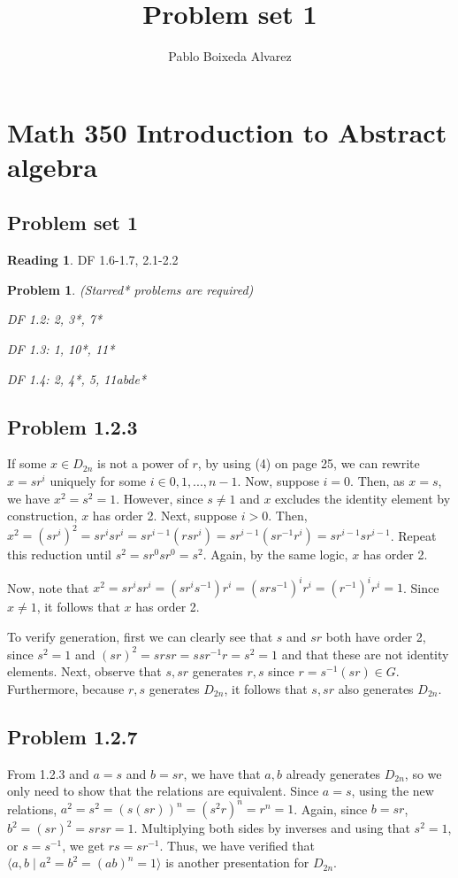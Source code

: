 \documentclass[11 pt]{article}
\title{Problem set 1}
\author{Pablo Boixeda Alvarez}
\newtheorem{Prob}{Problem}
\theoremstyle{definition}
\newtheorem{re}{Reading}
\theoremstyle{remark}
\begin{document}
\section*{Math 350 Introduction to Abstract algebra}
\subsection*{Problem set 1}

\begin{re}
	DF 1.6-1.7, 2.1-2.2
\end{re}
\begin{Prob} (Starred* problems are required)
	
	DF 1.2: 2, 3*, 7*
	
	DF 1.3: 1, 10*, 11*
	
	DF 1.4: 2, 4*, 5, 11abde*
\end{Prob}

\subsection*{Problem 1.2.3}
If some $x \in D_{2n}$ is not a power of $r$, by using (4) on page 25, we can rewrite $x = sr^i$ uniquely for some $i \in {0,1,...,n-1}$. Now, suppose $i=0$. Then, as $x=s$, we have $x^2=s^2=1$. However, since $s \neq 1$ and $x$ excludes the identity element by construction, $x$ has order 2. Next, suppose $i > 0$. Then, $x^2=(sr^i)^2 = sr^isr^i=sr^{i-1}(rsr^i)=sr^{i-1}(sr^{-1}r^i)=sr^{i-1}sr^{i-1}$. Repeat this reduction until $s^2=sr^0sr^0=s^2$. Again, by the same logic, $x$ has order 2.

Now, note that $x^2 = sr^isr^i = (sr^is^{-1})r^i = (srs^{-1})^ir^i= (r^{-1})^ir^i= 1$. Since $x \neq 1$, it follows that $x$ has order 2. 

To verify generation, first we can clearly see that $s$ and $sr$ both have order 2, since $s^2=1$ and $(sr)^2=srsr=ssr^{-1}r=s^2=1$ and that these are not identity elements. Next, observe that ${s,sr}$ generates ${r,s}$ since $r=s^{-1}(sr) \in G$. Furthermore, because ${r,s}$ generates $D_{2n}$, it follows that ${s,sr}$ also generates $D_{2n}$.

\subsection*{Problem 1.2.7}
From 1.2.3 and $a=s$ and $b=sr$, we have that $a,b$ already generates $D_{2n}$, so we only need to show that the relations are equivalent. Since $a=s$, using the new relations, $a^2 = s^2 = (s(sr))^n = (s^2r)^n = r^n = 1$. Again, since $b=sr$, $b^2=(sr)^2=srsr=1$. Multiplying both sides by inverses and using that $s^2=1$, or $s=s^{-1}$, we get $rs=sr^{-1}$. Thus, we have verified that $\langle a,b \mid a^2=b^2=(ab)^n=1 \rangle$ is another presentation for $D_{2n}$.
\end{document}
